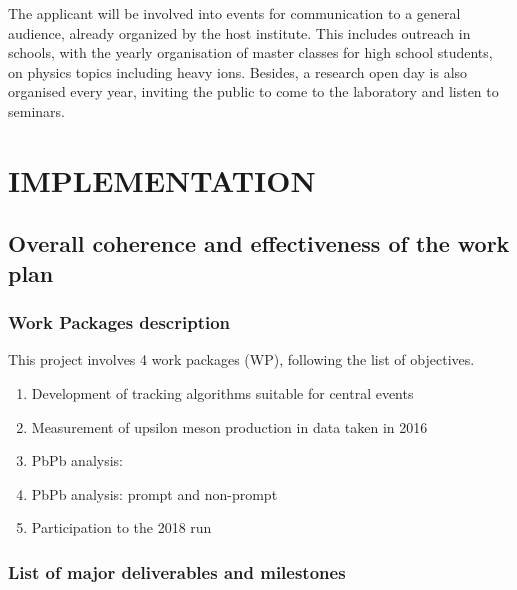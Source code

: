 \documentclass[a4paper,11pt]{article}
\begin{document}
The applicant will be involved into events for communication to a general audience, already organized by the host institute. This includes outreach in schools, with the yearly organisation of master classes for high school students, on physics topics including heavy ions. Besides, a research open day is also organised every year, inviting the public to come to the laboratory and listen to seminars.

%        

\section{IMPLEMENTATION}
\label{sec:implementation}

%            
           
\subsection{Overall coherence and effectiveness of the work plan}
\subsubsection*{Work Packages description}

This project involves 4 work packages (WP), following the list of objectives.

\begin{enumerate}
 \item Development of tracking algorithms suitable for central events
 \item Measurement of upsilon meson production in \pPb data taken in 2016
 \item PbPb analysis: \Dz 
 \item PbPb analysis: prompt and non-prompt \Jpsi
 \item Participation to the 2018 \PbPb run
\end{enumerate}


\subsubsection*{List of major deliverables and milestones}
\end{document}
